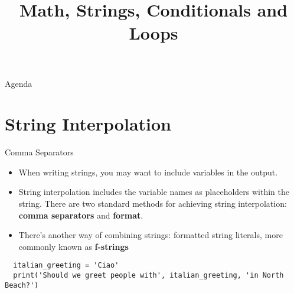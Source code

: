 \documentclass[../main.tex]{subfiles}
\title{Math, Strings, Conditionals and Loops}
\begin{document}
\begin{frame}
  \maketitle
\end{frame}


\begin{frame}{Agenda}
  \tableofcontents
\end{frame}



\section{String Interpolation}
\label{sec:string-interpolation}

\begin{frame}[fragile]{Comma Separators}
  \begin{itemize} \parskip3mm \justifying
  \item   When writing strings, you may want to include variables in the output.
  \item String interpolation includes the variable names as placeholders within the string. There are two standard methods for achieving string interpolation: \textbf{comma separators} and \textbf{format}.
  \item There’s another way of combining strings: \alert{formatted string literals}, more commonly known as \textbf{f-strings}
  \end{itemize}

\begin{lstlisting}
  italian_greeting = 'Ciao'
  print('Should we greet people with', italian_greeting, 'in North Beach?')
\end{lstlisting}
\end{frame}
\end{document}
